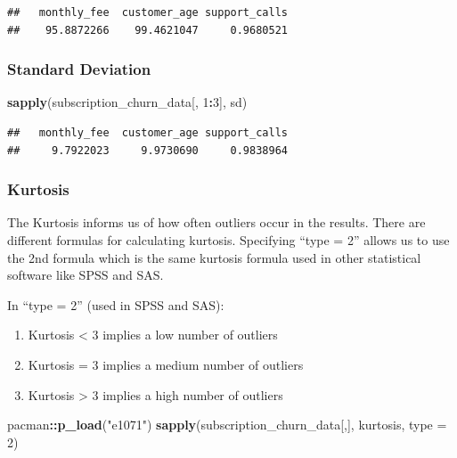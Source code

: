 \documentclass[
]{article}
\newenvironment{Shaded}{\begin{snugshade}}{\end{snugshade}}
\newcommand{\AttributeTok}[1]{\textcolor[rgb]{0.13,0.29,0.53}{#1}}
\newcommand{\DecValTok}[1]{\textcolor[rgb]{0.00,0.00,0.81}{#1}}
\newcommand{\FunctionTok}[1]{\textcolor[rgb]{0.13,0.29,0.53}{\textbf{#1}}}
\newcommand{\NormalTok}[1]{#1}
\newcommand{\SpecialCharTok}[1]{\textcolor[rgb]{0.81,0.36,0.00}{\textbf{#1}}}
\newcommand{\StringTok}[1]{\textcolor[rgb]{0.31,0.60,0.02}{#1}}
\begin{document}
\begin{verbatim}
##   monthly_fee  customer_age support_calls 
##    95.8872266    99.4621047     0.9680521
\end{verbatim}

\subsubsection{Standard Deviation}\label{standard-deviation}

\begin{Shaded}
\begin{Highlighting}[]
\FunctionTok{sapply}\NormalTok{(subscription\_churn\_data[, }\DecValTok{1}\SpecialCharTok{:}\DecValTok{3}\NormalTok{], sd)}
\end{Highlighting}
\end{Shaded}

\begin{verbatim}
##   monthly_fee  customer_age support_calls 
##     9.7922023     9.9730690     0.9838964
\end{verbatim}

\subsubsection{Kurtosis}\label{kurtosis}

The Kurtosis informs us of how often outliers occur in the results.
There are different formulas for calculating kurtosis. Specifying ``type
= 2'' allows us to use the 2nd formula which is the same kurtosis
formula used in other statistical software like SPSS and SAS.

In ``type = 2'' (used in SPSS and SAS):

\begin{enumerate}
\def\labelenumi{\arabic{enumi}.}
\item
  Kurtosis \textless{} 3 implies a low number of outliers
\item
  Kurtosis = 3 implies a medium number of outliers
\item
  Kurtosis \textgreater{} 3 implies a high number of outliers
\end{enumerate}

\begin{Shaded}
\begin{Highlighting}[]
\NormalTok{pacman}\SpecialCharTok{::}\FunctionTok{p\_load}\NormalTok{(}\StringTok{"e1071"}\NormalTok{)}
\FunctionTok{sapply}\NormalTok{(subscription\_churn\_data[,],  kurtosis, }\AttributeTok{type =} \DecValTok{2}\NormalTok{)}
\end{Highlighting}
\end{Shaded}
\end{document}
